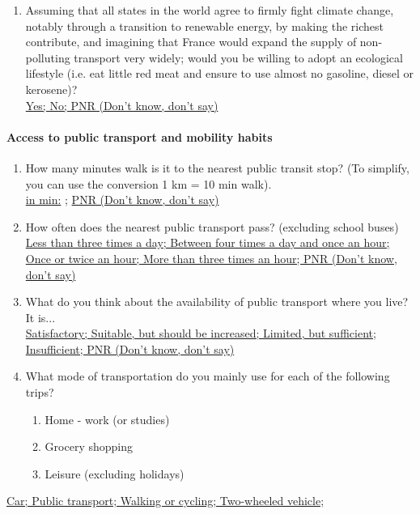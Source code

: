 \documentclass[english,5p,authoryear]{elsarticle}
\begin{document}
\begin{appendices}
\begin{enumerate}[resume,leftmargin=*]
{a sustainable way of life; I try, but I have trouble changing my habits} 
\item Assuming that all states in the world agree to firmly fight climate
change, notably through a transition to renewable energy, by making the richest contribute, and imagining that France would expand the
supply of non-polluting transport very widely; would you be willing
to adopt an ecological lifestyle (i.e. eat little red meat and ensure
to use almost no gasoline, diesel or kerosene)? \uline{}\\
\uline{Yes; No; PNR (Don't know, don't say) }
\end{enumerate}

%

%
%
%
%
%
%
%
%
%
%
%
%
%
%
%
%
%
%
%
%
%
%

\paragraph{Access to public transport and mobility habits}
\begin{enumerate}[resume,leftmargin=*]
\item How many minutes walk is it to the nearest public transit stop? (To
simplify, you can use the conversion 1 km = 10 min walk). \uline{}\\
\uline{in min:} ; \uline{PNR (Don't know, don't say) }
\item How often does the nearest public transport pass? (excluding school
buses) \uline{}\\
\uline{Less than three times a day; Between four times a day and once
an hour; Once or twice an hour; More than three times an hour; PNR
(Don't know, don't say) }
\item What do you think about the availability of public transport where
you live? It is... \uline{}\\
\uline{Satisfactory; Suitable, but should be increased; Limited, but
sufficient; Insufficient; PNR (Don't know, don't say) }
\item What mode of transportation do you mainly use for each of the following
trips?
\begin{enumerate}[resume,leftmargin=*]
\item Home - work (or studies) 
\item Grocery shopping 
\item Leisure (excluding holidays) 
\end{enumerate}
\end{enumerate}
\uline{Car; Public transport; Walking or cycling; Two-wheeled vehicle;
}
\end{appendices}
\end{document}
